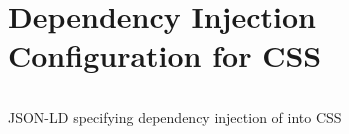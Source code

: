 \section{Dependency Injection Configuration for CSS}
\label{appendix:css-config}

\begin{code}
\inputminted[linenos,tabsize=2,breaklines]{json}{code/css-config.json}
\caption{JSON-LD specifying dependency injection of \middleware{} into \acrshort{CSS}}
\label{listing:css-config}
\end{code}